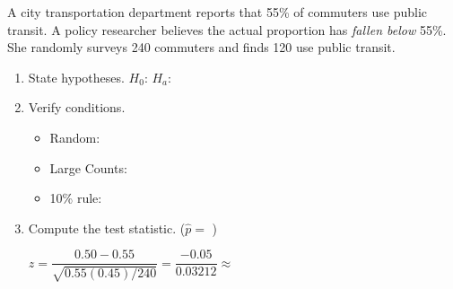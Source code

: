 \documentclass[10pt]{article}
\begin{document}
\namedateperiod

\vspace{0.15in}

A city transportation department reports that 55\% of commuters use public transit. A policy
researcher believes the actual proportion has \emph{fallen below} 55\%. She randomly surveys
240 commuters and finds 120 use public transit.

\begin{enumerate}
  \item State hypotheses.
        $H_0$:  \quad $H_a$: 

  \item Verify conditions.
        \begin{itemize}
          \item Random: 
          \item Large Counts: 
          \item 10\% rule: 
        \end{itemize}

  \item Compute the test statistic. \quad ($\hat p = $ )

        $z = \dfrac{0.50 - 0.55}{\sqrt{0.55(0.45)/240}} = \dfrac{-0.05}{0.03212} \approx$ 
\end{enumerate}
\end{document}
